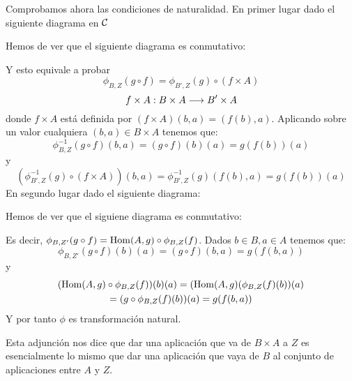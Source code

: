 Comprobamos ahora las condiciones de naturalidad. En primer lugar dado
el siguiente diagrama en $\mathcal{C}$
\begin{center}
\end{center}
Hemos de ver que el siguiente diagrama es conmutativo:
\begin{center}
\end{center}
Y esto equivale a probar
$$\phi_{B,  Z}(g \circ f) = \phi_{B', Z}(g) \circ (f\times A)$$
$$f\times A: B\times A\longrightarrow B'\times A$$
donde $f \times A$ está definida por
$(f\times A)(b, a) = (f(b), a)$. Aplicando sobre un valor cualquiera
$(b, a) \in B\times A$ tenemos que:
$$\phi_{B, Z}^{-1}(g \circ f)(b, a) = (g\circ f)(b)(a) = g(f(b))(a)$$
y
$$(\phi_{B', Z}^{-1}(g) \circ (f\times A))(b, a) =
   \phi_{B', Z}^{-1}(g)(f(b), a) = g(f(b))(a)$$
En segundo lugar dado el siguiente diagrama:
\begin{center}
\end{center}
Hemos de ver que el siguiene diagrama es conmutativo:
\begin{center}
\end{center}
Es decir, $\phi_{B, Z'}(g \circ f) = \operatorname{Hom}(A, g) \circ \phi_{B, Z}(f)$. Dados
$b \in B, a \in A$ tenemos que:
$$\phi_{B, Z'}(g \circ f)(b)(a) = (g\circ f)(b, a) = g(f(b, a))$$
y
\begin{multline*}
(\operatorname{Hom}(A, g)\circ\phi_{B, Z}(f))(b)(a) = (\operatorname{Hom}(A, g)(\phi_{B, Z}(f)(b))(a)\\
  = (g \circ \phi_{B,Z}(f)(b))(a) = g(f(b, a))
\end{multline*}
Y por tanto $\phi$ es transformación natural.

Esta adjunción nos dice que dar una aplicación que va de $B\times A$ a $Z$
es esencialmente lo mismo que dar una aplicación que vaya de $B$ al conjunto
de aplicaciones entre $A$ y $Z$.
